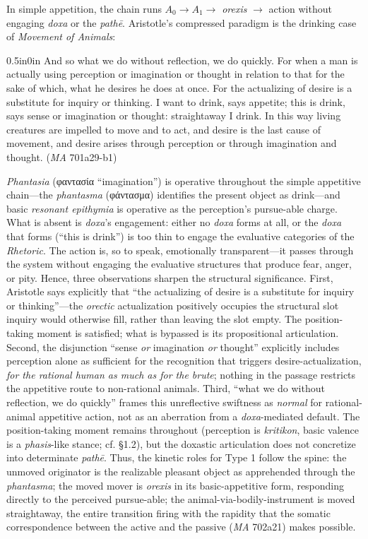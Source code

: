 \documentclass{article}
\newcommand{\gk}[1]{{\greekfont #1}}
\begin{document}
In simple appetition, the chain runs $A_0 \rightarrow A_1 \rightarrow$ \textit{orexis} $\rightarrow$ action without engaging \textit{doxa} or the \textit{pathē}. Aristotle's compressed paradigm is the drinking case of \textit{Movement of Animals}:
\begin{adjustwidth}{0.5in}{0in}
And so what we do without reflection, we do quickly. For when a man is actually using perception or imagination or thought in relation to that for the sake of which, what he desires he does at once. For the actualizing of desire is a substitute for inquiry or thinking. I want to drink, says appetite; this is drink, says sense or imagination or thought: straightaway I drink. In this way living creatures are impelled to move and to act, and desire is the last cause of movement, and desire arises through perception or through imagination and thought. (\textit{MA} 701a29-b1)
\end{adjustwidth}
\textit{Phantasia} (\gk{φαντασία} ``imagination'') is operative throughout the simple appetitive chain---the \textit{phantasma} (\gk{φάντασμα}) identifies the present object as drink---and basic \textit{resonant epithymia} is operative as the perception's pursue-able charge. What is absent is \textit{doxa}'s engagement: either no \textit{doxa} forms at all, or the \textit{doxa} that forms (``this is drink'') is too thin to engage the evaluative categories of the \textit{Rhetoric}. The action is, so to speak, emotionally transparent---it passes through the system without engaging the evaluative structures that produce fear, anger, or pity. Hence, three observations sharpen the structural significance. First, Aristotle says explicitly that ``the actualizing of desire is a substitute for inquiry or thinking''---the \textit{orectic} actualization positively occupies the structural slot inquiry would otherwise fill, rather than leaving the slot empty. The position-taking moment is satisfied; what is bypassed is its propositional articulation. Second, the disjunction ``sense \textit{or} imagination \textit{or} thought'' explicitly includes perception alone as sufficient for the recognition that triggers desire-actualization, \textit{for the rational human as much as for the brute}; nothing in the passage restricts the appetitive route to non-rational animals. Third, ``what we do without reflection, we do quickly'' frames this unreflective swiftness as \textit{normal} for rational-animal appetitive action, not as an aberration from a \textit{doxa}-mediated default. The position-taking moment remains throughout (perception is \textit{kritikon}, basic valence is a \textit{phasis}-like stance; cf. \S 1.2), but the doxastic articulation does not concretize into determinate \textit{pathē}. Thus, the kinetic roles for Type 1 follow the spine: the unmoved originator is the realizable pleasant object as apprehended through the \textit{phantasma}; the moved mover is \textit{orexis} in its basic-appetitive form, responding directly to the perceived pursue-able; the animal-via-bodily-instrument is moved straightaway, the entire transition firing with the rapidity that the somatic correspondence between the active and the passive (\textit{MA} 702a21) makes possible.
\end{document}

